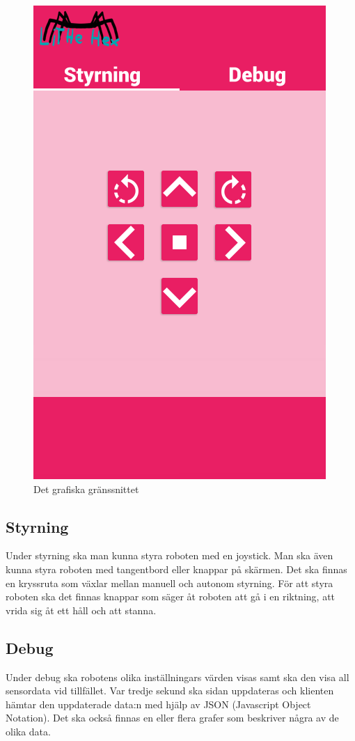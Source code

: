 \documentclass[a4paper,titlepage,12pt]{article}
\begin{document}
	\begin{figure}[h]
		\centering
		\includegraphics[width=0.5\linewidth]{images/gui-index.png}
		\caption{Det grafiska gränssnittet\label{fig:gui-overview}}
	\end{figure}
    
    \subsection{Styrning}
    Under styrning ska man kunna styra roboten med en joystick. Man ska även
    kunna styra roboten med tangentbord eller knappar på skärmen. Det ska finnas
    en kryssruta som växlar mellan manuell och autonom styrning. För att styra
    roboten ska det finnas knappar som säger åt roboten att gå i en riktning,
    att vrida sig åt ett håll och att stanna.

    \subsection{Debug}
	Under debug ska robotens olika inställningars värden visas samt ska den visa all 
	sensordata vid tillfället. Var tredje sekund ska sidan uppdateras och klienten 
	hämtar den uppdaterade data:n med hjälp av JSON (Javascript Object Notation). 
	Det ska också finnas en eller flera grafer som beskriver några av de olika data.

\end{document}
